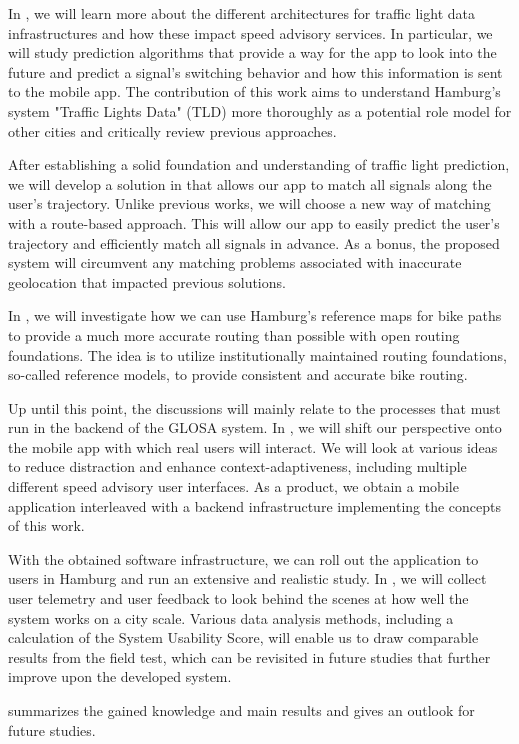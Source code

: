 In , we will learn more about the different architectures for traffic light data infrastructures and how these impact speed advisory services. In particular, we will study prediction algorithms that provide a way for the app to look into the future and predict a signal's switching behavior and how this information is sent to the mobile app. The contribution of this work aims to understand Hamburg's system "Traffic Lights Data" (TLD) more thoroughly as a potential role model for other cities and critically review previous approaches.

After establishing a solid foundation and understanding of traffic light prediction, we will develop a solution in  that allows our app to match all signals along the user's trajectory. Unlike previous works, we will choose a new way of matching with a route-based approach. This will allow our app to easily predict the user's trajectory and efficiently match all signals in advance. As a bonus, the proposed system will circumvent any matching problems associated with inaccurate geolocation that impacted previous solutions.

In , we will investigate how we can use Hamburg's reference maps for bike paths to provide a much more accurate routing than possible with open routing foundations. The idea is to utilize institutionally maintained routing foundations, so-called reference models, to provide consistent and accurate bike routing.

Up until this point, the discussions will mainly relate to the processes that must run in the backend of the GLOSA system. In , we will shift our perspective onto the mobile app with which real users will interact. We will look at various ideas to reduce distraction and enhance context-adaptiveness, including multiple different speed advisory user interfaces. As a product, we obtain a mobile application interleaved with a backend infrastructure implementing the concepts of this work.

With the obtained software infrastructure, we can roll out the application to users in Hamburg and run an extensive and realistic study. In , we will collect user telemetry and user feedback to look behind the scenes at how well the system works on a city scale. Various data analysis methods, including a calculation of the System Usability Score, will enable us to draw comparable results from the field test, which can be revisited in future studies that further improve upon the developed system.

 summarizes the gained knowledge and main results and gives an outlook for future studies. 
